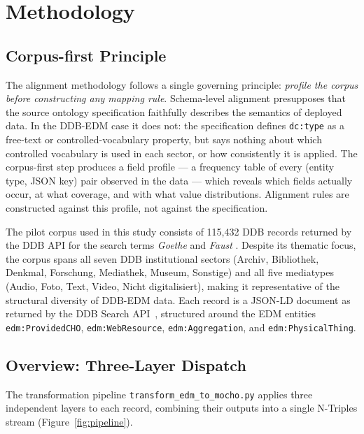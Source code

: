 
\section{Methodology}
\label{sec:methodology}

\subsection{Corpus-first Principle}

The alignment methodology follows a single governing principle: \emph{profile
the corpus before constructing any mapping rule}.
Schema-level alignment presupposes that the source ontology specification
faithfully describes the semantics of deployed data.
In the DDB-EDM case it does not: the specification defines \texttt{dc:type}
as a free-text or controlled-vocabulary property, but says nothing about
which controlled vocabulary is used in each sector, or how consistently it
is applied.
The corpus-first step produces a field profile --- a frequency table of every
(entity type, JSON key) pair observed in the data --- which reveals which
fields actually occur, at what coverage, and with what value distributions.
Alignment rules are constructed against this profile, not against the
specification.

The pilot corpus used in this study consists of 115{,}432 DDB records
returned by the DDB API for the search terms \textit{Goethe} and
\textit{Faust} .
Despite its thematic focus, the corpus spans all seven DDB institutional
sectors (Archiv, Bibliothek, Denkmal, Forschung, Mediathek, Museum, Sonstige)
and all five mediatypes (Audio, Foto, Text, Video, Nicht digitalisiert),
making it representative of the structural diversity of DDB-EDM data.
Each record is a JSON-LD document as returned by the DDB Search
API~, structured around the EDM entities
\texttt{edm:ProvidedCHO}, \texttt{edm:WebResource}, \texttt{edm:Aggregation},
and \texttt{edm:PhysicalThing}.

\subsection{Overview: Three-Layer Dispatch}

The transformation pipeline
\texttt{transform\_edm\_to\_mocho.py} applies three independent layers to
each record, combining their outputs into a single N-Triples stream
(Figure~\ref{fig:pipeline}).

